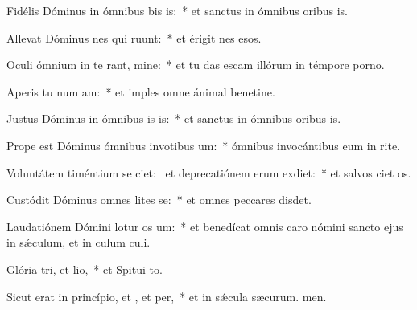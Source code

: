\item Fidélis Dóminus in ómnibus bis is:~* et sanctus in ómnibus oribus is.
\item Allevat Dóminus nes qui ruunt:~* et érigit nes esos.
\item Oculi ómnium in te rant, mine:~* et tu das escam illórum in témpore porno.
\item Aperis tu num am:~* et imples omne ánimal benetine.
\item Justus Dóminus in ómnibus is is:~* et sanctus in ómnibus oribus is.
\item Prope est Dóminus ómnibus invotibus um:~* ómnibus invocántibus eum in rite.
\item Voluntátem timéntium se ciet:~\pscross{} et deprecatiónem erum exdiet:~* et salvos ciet os.
\item Custódit Dóminus omnes lites se:~* et omnes peccares disdet.
\item Laudatiónem Dómini lotur os um:~* et benedícat omnis caro nómini sancto ejus in sǽculum, et in culum culi.
\item Glória tri, et lio,~* et Spitui to.
\item Sicut erat in princípio, et , et per,~* et in sǽcula sæcurum. men.
